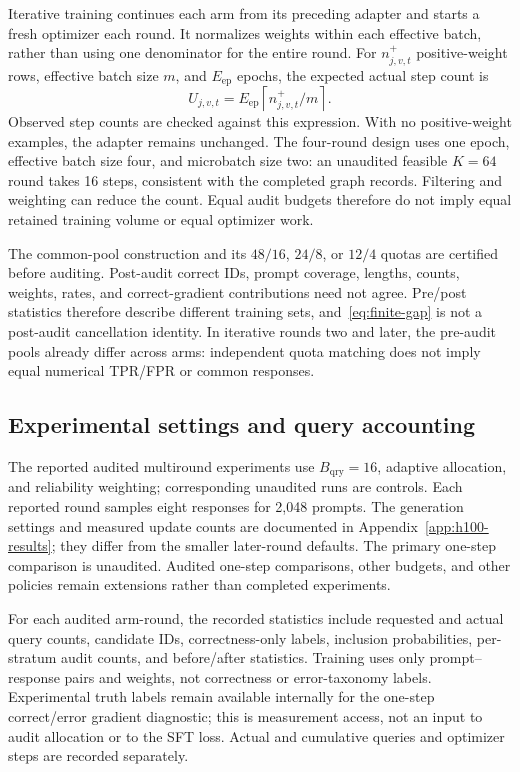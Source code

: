 Iterative training continues each arm from its preceding adapter and
starts a fresh optimizer each round. It normalizes weights within each
effective batch, rather than using one denominator for the entire round.
For $n^+_{j,v,t}$ positive-weight rows, effective batch size $m$, and
$E_{\mathrm{ep}}$ epochs, the expected actual step count is
\[
 U_{j,v,t}=E_{\mathrm{ep}}\left\lceil n^+_{j,v,t}/m\right\rceil.
\]
Observed step counts are checked against this expression. With no
positive-weight examples, the adapter remains unchanged. The four-round
design uses one epoch,
effective batch size four, and microbatch size two: an unaudited feasible
$K=64$ round takes 16 steps, consistent with the completed graph records.
Filtering and weighting can reduce the count. Equal audit budgets therefore
do not imply equal retained training volume or equal optimizer work.

The common-pool construction and its $48/16$, $24/8$, or $12/4$ quotas
are certified before auditing. Post-audit correct IDs, prompt coverage,
lengths, counts, weights, rates, and correct-gradient contributions need
not agree. Pre/post statistics therefore describe different training sets,
and~\eqref{eq:finite-gap} is not a post-audit cancellation identity.
In iterative rounds two and later,
the pre-audit pools already differ across arms: independent quota matching
does not imply equal numerical TPR/FPR or common responses.

\subsection{Experimental settings and query accounting}

The reported audited multiround experiments use $B_{\mathrm{qry}}=16$, adaptive
allocation, and reliability weighting; corresponding unaudited runs are
controls. Each reported round samples eight responses for 2,048 prompts.
The generation settings and measured update counts are documented in
Appendix~\ref{app:h100-results}; they differ from the smaller
later-round defaults. The primary one-step comparison is unaudited.
Audited one-step comparisons, other budgets, and other policies remain
extensions rather than completed experiments.

For each audited arm-round, the recorded statistics include requested and actual
query counts, candidate IDs, correctness-only labels, inclusion probabilities,
per-stratum audit counts, and before/after statistics. Training uses
only prompt--response pairs and weights, not correctness
or error-taxonomy labels. Experimental truth labels remain available
internally for the one-step correct/error gradient diagnostic; this is
measurement access, not an input to audit allocation or to the SFT loss.
Actual and cumulative queries and optimizer steps are recorded separately.

